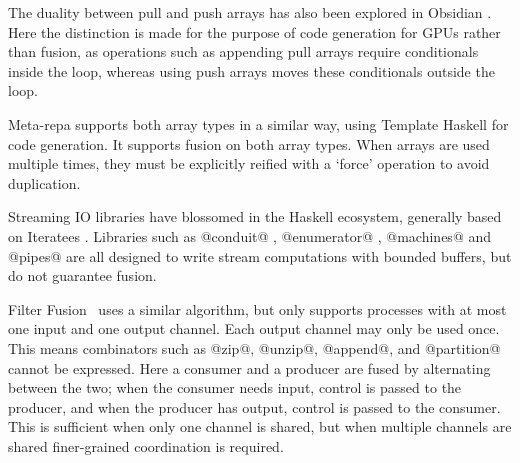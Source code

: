 
The duality between pull and push arrays has also been explored in Obsidian \cite{claessen2012expressive, svensson2014defunctionalizing}. Here the distinction is made for the purpose of code generation for GPUs rather than fusion, as operations such as appending pull arrays require conditionals inside the loop, whereas using push arrays moves these conditionals outside the loop.

Meta-repa \cite{ankner2013edsl} supports both array types in a similar way, using Template Haskell for code generation. It supports fusion on both array types. When arrays are used multiple times, they must be explicitly reified with a `force' operation to avoid duplication.


Streaming IO libraries have blossomed in the Haskell ecosystem, generally based on Iteratees \cite{kiselyov2012iteratees}. Libraries such as @conduit@ \cite{hackage:conduit}, @enumerator@ \cite{hackage:enumerator}, @machines@ \cite{hackage:machines} and @pipes@ \cite{hackage:pipes} are all designed to write stream computations with bounded buffers, but do not guarantee fusion.



Filter Fusion~\cite{proebsting1996filter} uses a similar algorithm, but only supports processes with at most one input and one output channel.
Each output channel may only be used once.
This means combinators such as @zip@, @unzip@, @append@, and @partition@ cannot be expressed.
Here a consumer and a producer are fused by alternating between the two; when the consumer needs input, control is passed to the producer, and when the producer has output, control is passed to the consumer.
This is sufficient when only one channel is shared, but when multiple channels are shared finer-grained coordination is required.

